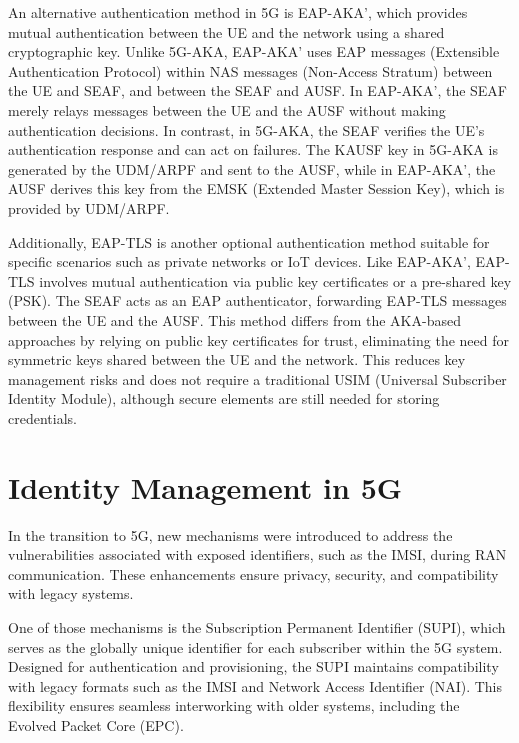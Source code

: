 

An alternative authentication method in 5G is EAP-AKA', which provides mutual authentication between the UE and the network using a shared cryptographic key. Unlike 5G-AKA, EAP-AKA' uses EAP messages (Extensible Authentication Protocol) within NAS messages (Non-Access Stratum) between the UE and SEAF, and between the SEAF and AUSF. In EAP-AKA', the SEAF merely relays messages between the UE and the AUSF without making authentication decisions. In contrast, in 5G-AKA, the SEAF verifies the UE's authentication response and can act on failures. The KAUSF key in 5G-AKA is generated by the UDM/ARPF and sent to the AUSF, while in EAP-AKA', the AUSF derives this key from the EMSK (Extended Master Session Key), which is provided by UDM/ARPF.


Additionally, EAP-TLS is another optional authentication method suitable for specific scenarios such as private networks or IoT devices. Like EAP-AKA', EAP-TLS involves mutual authentication via public key certificates or a pre-shared key (PSK). The SEAF acts as an EAP authenticator, forwarding EAP-TLS messages between the UE and the AUSF. This method differs from the AKA-based approaches by relying on public key certificates for trust, eliminating the need for symmetric keys shared between the UE and the network. This reduces key management risks and does not require a traditional USIM (Universal Subscriber Identity Module), although secure elements are still needed for storing credentials.

\section{Identity Management in \acs{5G}} %

In the transition to \ac{5G}, new mechanisms were introduced to address the vulnerabilities associated with exposed identifiers, such as the \ac{IMSI}, during \ac{RAN} communication. These enhancements ensure privacy, security, and compatibility with legacy systems.

One of those mechanisms is the Subscription Permanent Identifier (SUPI), which serves as the globally unique identifier for each subscriber within the \ac{5G} system. Designed for authentication and provisioning, the SUPI maintains compatibility with legacy formats such as the IMSI and Network Access Identifier (NAI). This flexibility ensures seamless interworking with older systems, including the \ac{Evolved Packet Core (EPC)}.


